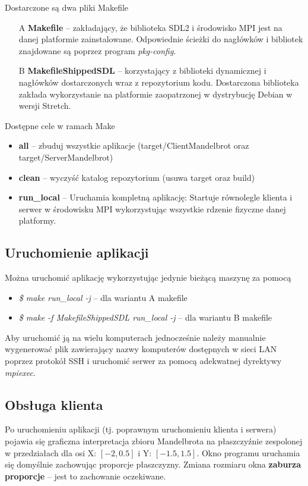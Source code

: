Dostarczone są dwa pliki Makefile
\begin{itemize}
    \item [A] \textbf{Makefile} -- zakładający, że biblioteka SDL2 i środowisko
    MPI jest na danej platformie zainstalowane. Odpowiednie ścieżki do nagłówków
    i bibliotek znajdowane są poprzez program \textit{pkg-config}.
    \item [B] \textbf{MakefileShippedSDL} -- korzystający z biblioteki dynamicznej i
    nagłówków dostarczonych wraz z repozytorium kodu. Dostarczona biblioteka
    zakłada wykorzystanie na platformie zaopatrzonej w dystrybucję Debian w
    wersji Stretch. 
\end{itemize}

Dostępne cele w ramach Make
\begin{itemize}
    \item \textbf{all} -- zbuduj wszystkie aplikacje (target/ClientMandelbrot
    oraz target/ServerMandelbrot)
    \item \textbf{clean} -- wyczyść katalog repozytorium (usuwa target oraz build)
    \item \textbf{run\_local} -- Uruchamia kompletną aplikację: Startuje
    równolegle klienta i serwer w środowisku MPI wykorzystując wszystkie rdzenie
    fizyczne danej platformy.
\end{itemize}

\subsection{Uruchomienie aplikacji}
Można uruchomić aplikację wykorzystując jedynie bieżącą maszynę za pomocą
\begin{itemize}
    \item \textit{\$ make run\_local -j} -- dla wariantu A makefile
    \item \textit{\$ make -f MakefileShippedSDL run\_local -j} -- dla wariantu B makefile
\end{itemize}

Aby uruchomić ją na wielu komputerach jednocześnie należy manualnie wygenerować
plik zawierający nazwy komputerów dostępnych w sieci LAN poprzez protokół SSH i
uruchomić serwer za pomocą adekwatnej dyrektywy \textit{mpiexec}.

\subsection{Obsługa klienta}
Po uruchomieniu aplikacji (tj. poprawnym uruchomieniu klienta i serwera) pojawia
się graficzna interpretacja zbioru Mandelbrota na płaszczyźnie zespolonej w
przedziałach dla osi X: $[-2, 0.5]$ i Y: $[-1.5, 1.5]$. Okno programu uruchamia
się domyślnie zachowując proporcje płaszczyzny. Zmiana rozmiaru okna
\textbf{zaburza proporcje} -- jest to zachowanie oczekiwane.

